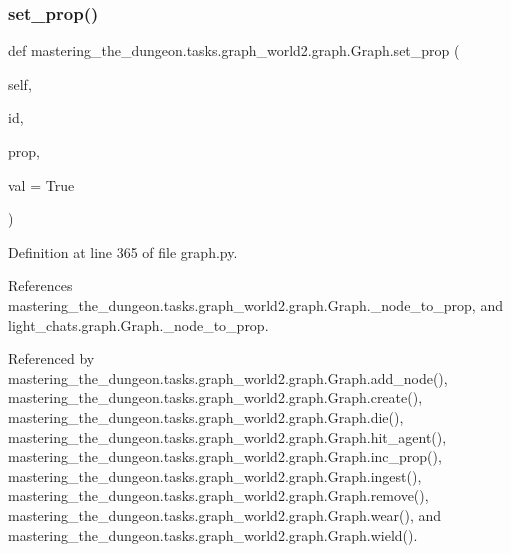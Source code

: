 \subsubsection{\texorpdfstring{set\+\_\+prop()}{set\_prop()}}
{\footnotesize\ttfamily def mastering\+\_\+the\+\_\+dungeon.\+tasks.\+graph\+\_\+world2.\+graph.\+Graph.\+set\+\_\+prop (\begin{DoxyParamCaption}\item[{}]{self,  }\item[{}]{id,  }\item[{}]{prop,  }\item[{}]{val = {\ttfamily True} }\end{DoxyParamCaption})}



Definition at line 365 of file graph.\+py.



References mastering\+\_\+the\+\_\+dungeon.\+tasks.\+graph\+\_\+world2.\+graph.\+Graph.\+\_\+node\+\_\+to\+\_\+prop, and light\+\_\+chats.\+graph.\+Graph.\+\_\+node\+\_\+to\+\_\+prop.



Referenced by mastering\+\_\+the\+\_\+dungeon.\+tasks.\+graph\+\_\+world2.\+graph.\+Graph.\+add\+\_\+node(), mastering\+\_\+the\+\_\+dungeon.\+tasks.\+graph\+\_\+world2.\+graph.\+Graph.\+create(), mastering\+\_\+the\+\_\+dungeon.\+tasks.\+graph\+\_\+world2.\+graph.\+Graph.\+die(), mastering\+\_\+the\+\_\+dungeon.\+tasks.\+graph\+\_\+world2.\+graph.\+Graph.\+hit\+\_\+agent(), mastering\+\_\+the\+\_\+dungeon.\+tasks.\+graph\+\_\+world2.\+graph.\+Graph.\+inc\+\_\+prop(), mastering\+\_\+the\+\_\+dungeon.\+tasks.\+graph\+\_\+world2.\+graph.\+Graph.\+ingest(), mastering\+\_\+the\+\_\+dungeon.\+tasks.\+graph\+\_\+world2.\+graph.\+Graph.\+remove(), mastering\+\_\+the\+\_\+dungeon.\+tasks.\+graph\+\_\+world2.\+graph.\+Graph.\+wear(), and mastering\+\_\+the\+\_\+dungeon.\+tasks.\+graph\+\_\+world2.\+graph.\+Graph.\+wield().

